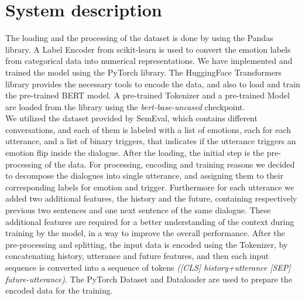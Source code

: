 \documentclass[11pt,table,xcdraw]{article}
\begin{document}
\section{System description}
\label{sec:system}
The loading and the processing of the dataset is done by using the Pandas library. A Label Encoder from scikit-learn is used to convert the emotion labels from categorical data into numerical representations. We have implemented and trained the model using the PyTorch library. The HuggingFace Transformers library provides the necessary tools to encode the data, and also to load and train the pre-trained BERT model. A pre-trained Tokenizer and a pre-trained Model are loaded from the library using the \textit{bert-base-uncased} checkpoint.\\

We utilized the dataset provided by SemEval, which contains different conversations, and each of them is labeled with a list of emotions, each for each utterance, and a list of binary triggers, that indicates if the utterance triggers an emotion flip inside the dialogue. After the loading, the initial step is the pre-processing of the data. For processing, encoding and training reasons we decided to decompose the dialogues into single utterance, and assigning them to their corresponding labels for emotion and trigger. Furthermore for each utterance we added two additional features, the history and the future, containing respectively previous two sentences and one next sentence of the same dialogue. These additional features are required for a better understanding of the context during training by the model, in a way to improve the overall performance.
After the pre-processing and splitting, the input data is encoded using the Tokenizer, by concatenating history, utterance and future features, and then each input sequence is converted into a sequence of tokens \textit{([CLS] history+utterance [SEP] future-utterance)}. The PyTorch Dataset and Dataloader are used to prepare the encoded data for the training.\\
\end{document}
